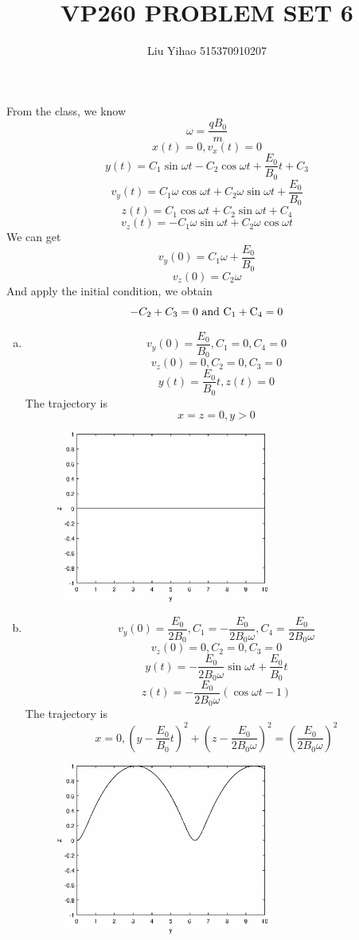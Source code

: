 \documentclass{article}
\title{VP260 PROBLEM SET 6}
\author{Liu Yihao 515370910207}
\date{}
\begin{document}
\maketitle

\section{}
From the class, we know
$$\omega=\frac{qB_0}{m}$$
$$x(t)=0,v_x(t)=0$$
$$y(t)=C_1\sin\omega t-C_2\cos\omega t+\frac{E_0}{B_0}t+C_3$$
$$v_y(t)=C_1\omega\cos\omega t+C_2\omega\sin\omega t+\frac{E_0}{B_0}$$
$$z(t)=C_1\cos\omega t+C_2\sin\omega t+C_4$$
$$v_z(t)=-C_1\omega\sin\omega t+C_2\omega\cos\omega t$$
We can get
$$v_y(0)=C_1\omega+\frac{E_0}{B_0}$$
$$v_z(0)=C_2\omega$$
And apply the initial condition, we obtain
$$-C_2+C_3=0\ \rm{and}\ C_1+C_4=0$$
\begin{enumerate}[(a)]
\item
$$v_y(0)=\frac{E_0}{B_0},C_1=0,C_4=0$$
$$v_z(0)=0,C_2=0,C_3=0$$
$$y(t)=\frac{E_0}{B_0}t,z(t)=0$$
The trajectory is
$$x=z=0,y>0$$
\begin{figure}[h!]
    \centering
    \includegraphics[width=7cm]{1_1.eps}
    \label{fig-1-1}
\end{figure}
\newpage
\item
$$v_y(0)=\frac{E_0}{2B_0},C_1=-\frac{E_0}{2B_0\omega},C_4=\frac{E_0}{2B_0\omega}$$
$$v_z(0)=0,C_2=0,C_3=0$$
$$y(t)=-\frac{E_0}{2B_0\omega}\sin\omega t+\frac{E_0}{B_0}t$$
$$z(t)=-\frac{E_0}{2B_0\omega}(\cos\omega t-1)$$
The trajectory is
$$x=0,\left(y-\frac{E_0}{B_0}t\right)^2+\left(z-\frac{E_0}{2B_0\omega}\right)^2=\left(\frac{E_0}{2B_0\omega}\right)^2$$
\begin{figure}[h!]
    \centering
    \includegraphics[width=7cm]{1_2.eps}

\end{figure}
\end{enumerate}
\end{document}
